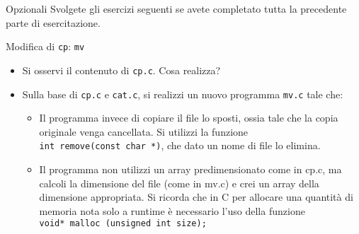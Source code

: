 \documentclass{beamer}
\begin{document}
\begin{frame}[fragile]{Opzionali}
Svolgete gli esercizi seguenti se avete completato tutta la precedente parte di esercitazione.
\end{frame}

\begin{frame}[fragile]{Modifica di \texttt{cp}: \texttt{mv}}
\begin{itemize}
 \item Si osservi il contenuto di \texttt{cp.c}. Cosa realizza?
 \item Sulla base di \texttt{cp.c} e \texttt{cat.c}, si realizzi un nuovo programma \texttt{mv.c} tale che:
 \begin{itemize}
  \item Il programma invece di copiare il file lo sposti, ossia tale che la copia originale venga cancellata. Si utilizzi la funzione \\ \texttt{int remove(const char *)}, che dato un nome di file lo elimina.
  \item Il programma non utilizzi un array predimensionato come in cp.c, ma calcoli la dimensione del file (come in mv.c) e crei un array della dimensione appropriata. Si ricorda che in C per allocare una quantità di memoria nota solo a runtime è necessario l'uso della funzione \\ \texttt{void* malloc (unsigned int size);}
 \end{itemize}
\end{itemize}
\end{frame}
\end{document}
